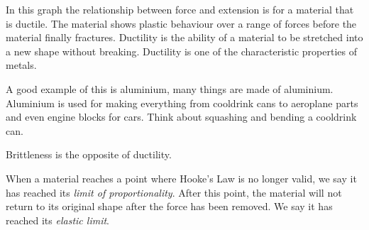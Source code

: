 In this graph the relationship between force and extension is for a material that is ductile. The material shows plastic behaviour over a range of forces before the material finally fractures. Ductility is the ability of a material to be stretched into a new shape without breaking. Ductility is one of the characteristic properties of metals.

A good example of this is aluminium, many things are made of aluminium. Aluminium is used for making everything from cooldrink cans to aeroplane parts and even engine blocks for cars. Think about squashing and bending a cooldrink can.

Brittleness is the opposite of ductility.


 
When a material reaches a point where Hooke's Law is no longer valid, we say it has reached its \emph{limit of proportionality}. After this point, the material will not return to its original shape after the force has been removed. We say it has reached its \emph{elastic limit}.




